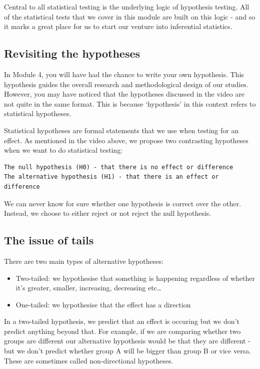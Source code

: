 \documentclass[
]{book}
\providecommand{\tightlist}{%
  \setlength{\itemsep}{0pt}\setlength{\parskip}{0pt}}
\begin{document}
Central to all statistical testing is the underlying logic of hypothesis testing. All of the statistical tests that we cover in this module are built on this logic - and so it marks a great place for us to start our venture into inferential statistics.

\hypertarget{revisiting-the-hypotheses}{%
\subsection{Revisiting the hypotheses}\label{revisiting-the-hypotheses}}

In Module 4, you will have had the chance to write your own hypothesis. This hypothesis guides the overall research and methodological design of our studies. However, you may have noticed that the hypotheses discussed in the video are not quite in the same format. This is because `hypothesis' in this context refers to statistical hypotheses.

Statistical hypotheses are formal statements that we use when testing for an effect. As mentioned in the video above, we propose two contrasting hypotheses when we want to do statistical testing:

\begin{verbatim}
The null hypothesis (H0) - that there is no effect or difference
The alternative hypothesis (H1) - that there is an effect or difference
\end{verbatim}

We can never know for sure whether one hypothesis is correct over the other. Instead, we choose to either reject or not reject the null hypothesis.

\hypertarget{the-issue-of-tails}{%
\subsection{The issue of tails}\label{the-issue-of-tails}}

There are two main types of alternative hypotheses:

\begin{itemize}
\tightlist
\item
  Two-tailed: we hypothesise that something is happening regardless of whether it's greater, smaller, increasing, decreasing etc\ldots{}
\item
  One-tailed: we hypothesise that the effect has a direction
\end{itemize}

In a two-tailed hypothesis, we predict that an effect is occuring but we don't predict anything beyond that. For example, if we are comparing whether two groups are different our alternative hypothesis would be that they are different - but we don't predict whether group A will be bigger than group B or vice versa. These are sometimes called non-directional hypotheses.
\end{document}
